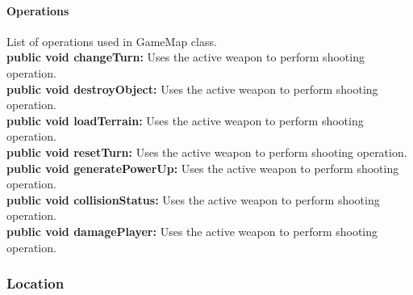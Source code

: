 \documentclass[12pt]{article} %
\begin{document}
\paragraph{Operations \\}
List of operations used in GameMap class.\\
\textbf{public void changeTurn:} Uses the active weapon to perform shooting operation. \\
\textbf{public void destroyObject:} Uses the active weapon to perform shooting operation. \\
\textbf{public void loadTerrain:} Uses the active weapon to perform shooting operation. \\
\textbf{public void resetTurn:} Uses the active weapon to perform shooting operation. \\
\textbf{public void generatePowerUp:} Uses the active weapon to perform shooting operation. \\
\textbf{public void collisionStatus:} Uses the active weapon to perform shooting operation. \\
\textbf{public void damagePlayer:} Uses the active weapon to perform shooting operation. 




\subsubsection{Location} %
\end{document}
